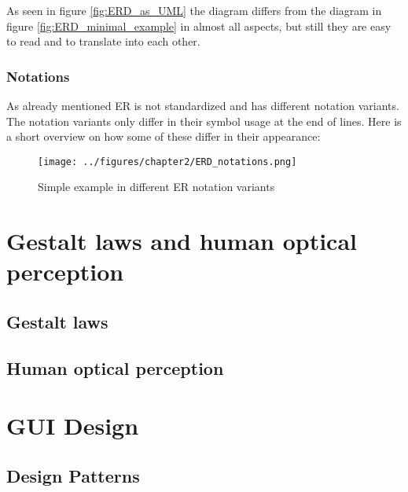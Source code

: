 \documentclass[twoside, openright, 12pt]{book}
\begin{document}
As seen in figure \ref{fig:ERD_as_UML} the diagram differs from the diagram in figure \ref{fig:ERD_minimal_example} in almost all aspects, but still they are easy to read and to translate into each other.



\subsubsection{Notations}
\label{ERD_notations}
As already mentioned ER is not standardized and has different notation variants.
The notation variants only differ in their symbol usage at the end of lines.
Here is a short overview on how some of these differ in their appearance:

\begin{figure}[htb]
	\centering
	\texttt{[image: ../figures/chapter2/ERD\_notations.png]}
	\caption{Simple example in different ER notation variants}
	\label{fig:ERD_notations}
\end{figure}




\section{Gestalt laws and human optical perception}
\label{gestalt_laws_and_human_optical_perception}


\subsection{Gestalt laws}
\label{gestalt_laws}


\subsection{Human optical perception}
\label{human_optical_perception}




\section{GUI Design}
\label{gui_design}


\subsection{Design Patterns}
\label{design_patterns}
\end{document}
